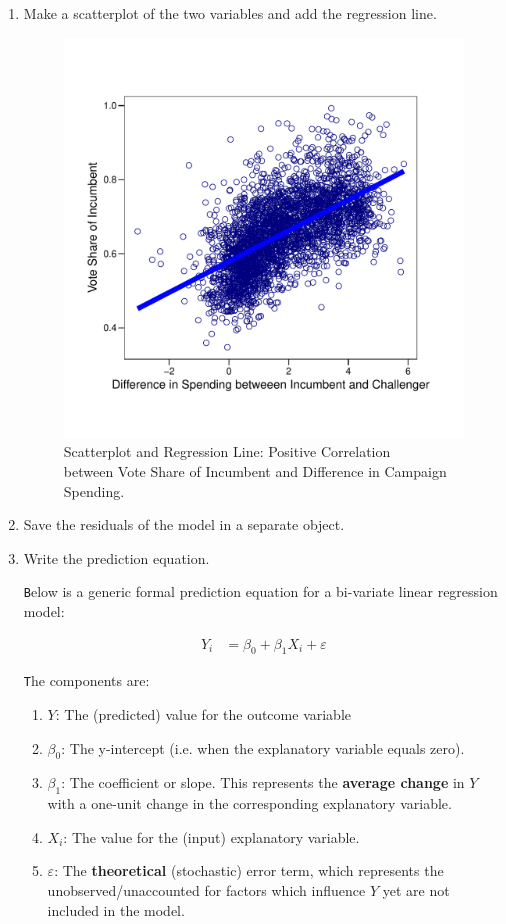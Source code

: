 \documentclass[12pt,letterpaper]{article}
\begin{document}
\begin{enumerate}
		\item Make a scatterplot of the two variables and add the regression line.
		
			
		
			\begin{figure}[H]
				\centering
				\captionsetup{justification=centering, font = footnotesize}
				\caption{Scatterplot and Regression Line: Positive Correlation\\
					between Vote Share of Incumbent and Difference in Campaign Spending.}
				\label{fig:plot_Q1}
				\includegraphics[width=.75\textwidth, trim = 0 2cm 0 2cm, clip]{plot_Q1.pdf}
			\end{figure}
		
		\item Save the residuals of the model in a separate object.
		
				
		
		\item Write the prediction equation.
		
			\texttt Below is a generic formal prediction equation  for a bi-variate linear regression model:
		
		\begin{align*}
			Y_i &= \beta_0 + \beta_1 X_i + \varepsilon
		\end{align*}
		
		\texttt The components are:
		\begin{enumerate}
			\item $Y$: The (predicted) value for the outcome variable
			\item $\beta_0$: The y-intercept (i.e. when the explanatory variable equals zero).
			\item $\beta_1$: The coefficient or slope. This represents the \textbf{average change} in $Y$ with a one-unit change in the corresponding explanatory variable.
			\item  $X_i$: The value for the (input) explanatory variable.
			\item $\varepsilon$: The \textbf{theoretical} (stochastic) error term, which represents the unobserved/unaccounted for factors which influence $Y$ yet are not included in the model.
			

\end{enumerate}
\end{enumerate}
\end{document}
